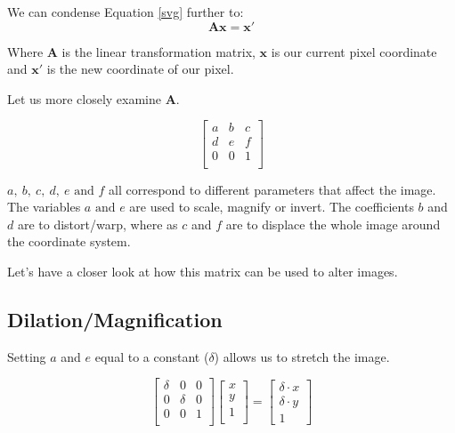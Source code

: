 \documentclass{article}
\begin{document}
We can condense Equation \ref{svg} further to: 
\[%
    \mathbf{A} \mathbf{x} = \mathbf{x}'
\]%

Where $ \mathbf{A} $ is the linear transformation matrix, $ \mathbf{x} $ is our
current pixel coordinate and $ \mathbf{x}' $ is the new coordinate of our pixel.



Let us more closely examine $ \mathbf{A} $.

\[%
    \begin{bmatrix}
        a & b & c \\
		d & e & f \\
		0 & 0 & 1 \\	
    \end{bmatrix}
\]%

$ a,\ b, \ c, \ d, \ e \text{ and }f$ all correspond to different parameters that
affect the image.  The variables $ a \text{ and } e $ are used to scale, magnify 
or invert. The coefficients $ b $ and  $ d $ are to distort/warp, where as $ c $ and 
$ f $ are to displace the whole image around the coordinate system.

Let's have a closer look at how this matrix can be used to alter images.

\clearpage
\subsection{Dilation/Magnification} 

Setting $ a $ and $ e $ equal to a constant ($ \delta $) allows us to stretch the image.

\[%
    \begin{bmatrix} 
        \delta & 0 & 0 \\
		0 & \delta & 0 \\
		0 & 0 & 1 \\		
    \end{bmatrix}
    \begin{bmatrix}
        x \\
        y \\
		1 \\		
    \end{bmatrix}
    =
    \begin{bmatrix} \delta \cdot x \\ \delta \cdot y \\ 1 \end{bmatrix}
\]%

\begin{figure}[!htbp]
    \centering
\end{figure}
\end{document}
